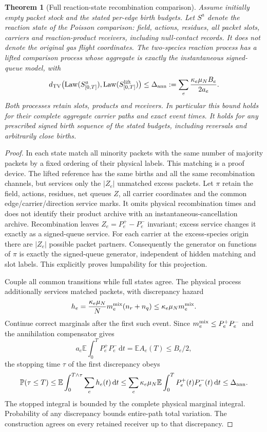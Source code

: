 \documentclass[11pt]{article}
\newtheorem{theorem}{Theorem}[section]
\theoremstyle{definition}\newtheorem{definition}[theorem]{Definition}
\theoremstyle{remark}\newtheorem{remark}[theorem]{Remark}
\newcommand{\E}{\mathbb E}\newcommand{\Prb}{\mathbb P}
\newcommand{\Law}{\operatorname{Law}}\newcommand{\TV}{d_{\mathrm{TV}}}
\newcommand{\dd}{\,\mathrm d}\newcommand{\Var}{\operatorname{Var}}
\begin{document}
\begin{theorem}[Full reaction-state recombination comparison]\label{thm:annihilation}
Assume initially empty packet stock and the stated per-edge birth budgets. Let $S^a$ denote the reaction state of the Poisson comparison: field, actions, residues, all packet slots, carriers and reaction-product receivers, including null-contact records. It does not denote the original gas flight coordinates. The two-species reaction process has a lifted comparison process whose aggregate is exactly the instantaneous signed-queue model, with
\begin{equation}
\TV\bigl(\Law(S^{a}_{[0,T]}),\Law(S^{\rm lift}_{[0,T]})\bigr)
 \le \Delta_{\rm ann}:=\sum_e\frac{\kappa_e\mu_NB_e}{2a_e}.
 \label{eq:annerror}
\end{equation}
Both processes retain slots, products and receivers. In particular this bound holds for their complete aggregate carrier paths and exact event times. It holds for any prescribed signed birth sequence of the stated budgets, including reversals and arbitrarily close births.
\end{theorem}
\begin{proof}
In each state match all minority packets with the same number of majority packets by a fixed ordering of their physical labels. This matching is a proof device. The lifted reference has the same births and all the same recombination channels, but services only the $|Z_e|$ unmatched excess packets. Let $\pi$ retain the field, actions, residues, net queues $Z$, all carrier coordinates and the common edge/carrier/direction service marks. It omits physical recombination times and does not identify their product archive with an instantaneous-cancellation archive. Recombination leaves $Z_e=P_e^+-P_e^-$ invariant; excess service changes it exactly as a signed-queue service. For each carrier at the excess-species origin there are $|Z_e|$ possible packet partners. Consequently the generator on functions of $\pi$ is exactly the signed-queue generator, independent of hidden matching and slot labels. This explicitly proves lumpability for this projection.

Couple all common transitions while full states agree. The physical process additionally services matched packets, with discrepancy hazard
\[
 h_e=\frac{\kappa_e\mu_N}{N}m_e^{\rm mix}(n_r+n_q)\le\kappa_e\mu_Nm_e^{\rm mix}.
\]
Continue correct marginals after the first such event. Since $m_e^{\rm mix}\le P_e^+P_e^-$ and the annihilation compensator gives
\[
 a_e\E\int_0^T P_e^+P_e^-\dd t=\E A_e(T)\le B_e/2,
\]
the stopping time $\tau$ of the first discrepancy obeys
\[
 \Prb(\tau\le T)\le
 \E\int_0^{T\wedge\tau}\sum_e h_e(t)\dd t
 \le\sum_e\kappa_e\mu_N\E\int_0^T P_e^+(t)P_e^-(t)\dd t
 \le\Delta_{\rm ann}.
\]
The stopped integral is bounded by the complete physical marginal
integral.  Probability of any discrepancy bounds entire-path total variation. The construction agrees on every retained receiver up to that discrepancy.
\end{proof}
\end{document}
